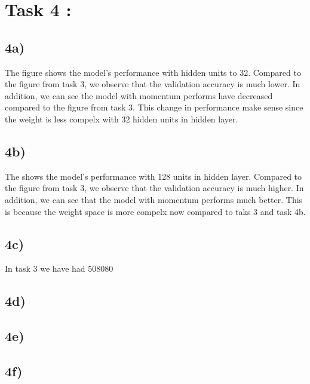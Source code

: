 \documentclass{article}
\begin{document}
\section*{Task 4 : }

\subsection*{4a)}

The figure shows the model's performance with hidden units to 32.
Compared to the figure from task 3, we observe that the validation accuracy is much lower. In addition, we can see the model with momentum performs have decreased compared to 
the figure from task 3. This change in performance make sense since the weight is less compelx with 32 hidden units in hidden layer. 

\subsection*{4b)}

The shows the model's performance with 128 units in hidden layer. Compared to the figure from task 3,  we observe that the validation accuracy is much higher.
In addition, we can see that the model with momentum performs much better. This is because the weight space is more compelx now compared to taks 3 and task 4b. 


\subsection*{4c)}

In task 3 we have had 508080

\subsection*{4d)}
    
\subsection*{4e)}

\subsection*{4f)}
\end{document}

